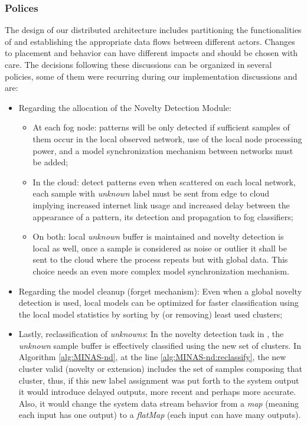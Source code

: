 \subsubsection{Polices}\label{sec:polices}

The design of our distributed \nd architecture includes partitioning the
functionalities of \minas and establishing the appropriate data flows
between different actors.
Changes to placement and behavior can have different impacts and should be
chosen with care.
The decisions following these discussions can be organized in several policies,
some of them were recurring during our implementation discussions and are:

\begin{itemize}
  \item Regarding the allocation of the Novelty Detection Module:
  \begin{itemize}
    
    \item At each fog node: patterns will be only detected if sufficient samples
    of them occur in the local observed network, use of the local node
    processing power, and a model synchronization mechanism between networks
    must be added;

    \item In the cloud: detect patterns even when scattered on each local
    network, each sample with \emph{unknown} label must be sent from edge to
    cloud implying increased internet link usage and increased delay between the
    appearance of a pattern, its detection and propagation to fog classifiers;

    \item On both: local \emph{unknown} buffer is maintained and novelty
    detection is local as well, once a sample is considered as noise or outlier
    it shall be sent to the cloud where the process repeats but with global
    data.
    This choice needs an even more complex model synchronization mechanism.

  \end{itemize}
    
  \item Regarding the model cleanup (forget mechanism): Even when a global
  novelty detection is used, local models can be optimized for faster
  classification using the local model statistics by sorting by (or removing)
  least used clusters;

  \item Lastly, reclassification of \emph{unknowns}: In the novelty detection
  task in \minas, the \emph{unknown} sample buffer is effectively classified
  using the new set of clusters.
  In Algorithm \ref{alg:MINAS-nd}, at the line \ref{alg:MINAS-nd:reclassify}, the
  new cluster valid (novelty or extension) includes the set of samples composing
  that cluster, thus, if this new label assignment was put forth to the system
  output it would introduce delayed outputs, more recent and perhaps more
  accurate.
  Also, it would change the system data stream behavior from a \emph{map}
  (meaning each input has one output) to a \emph{flatMap} (each input can have
  many outputs).

\end{itemize}


